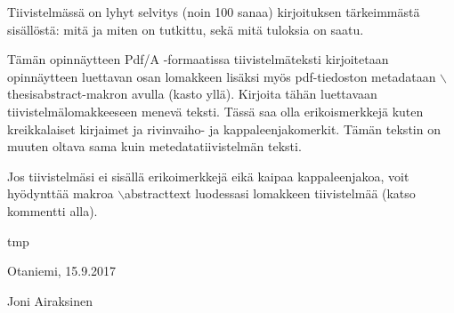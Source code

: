 \documentclass[finnish, 12pt, a4paper, elec, utf8, pdfa, online]{aaltothesis}
\date{23.4.2018}
\begin{document}
\makecoverpage

\makecopyrightpage

\begin{abstractpage}[finnish]
Tiivistelmässä on lyhyt selvitys (noin 100 sanaa) kirjoituksen tärkeimmästä
sisällöstä: mitä ja miten on tutkittu, sekä mitä tuloksia on saatu.

Tämän opinnäytteen Pdf/A -formaatissa tiivistelmäteksti kirjoitetaan
opinnäytteen luettavan osan lomakkeen lisäksi myös pdf-tiedoston metadataan
$\backslash$thesisabstract-makron avulla (kasto yllä). Kirjoita tähän
luettavaan tiivistelmälomakkeeseen menevä teksti. Tässä saa olla erikoismerkkejä
kuten kreikkalaiset kirjaimet ja rivinvaiho- ja kappaleenjakomerkit. Tämän
tekstin on muuten oltava sama kuin metedatatiivistelmän teksti.

Jos tiivistelmäsi ei sisällä erikoimerkkejä eikä kaipaa kappaleenjakoa, voit
hyödynttää makroa $\backslash$abstracttext luodessasi lomakkeen tiivistelmää
(katso kommentti alla).
\end{abstractpage}


\newpage





tmp

\vspace{5cm}
Otaniemi, 15.9.2017

\vspace{5mm}
{\hfill Joni Airaksinen \hspace{1cm}}
\end{document}
